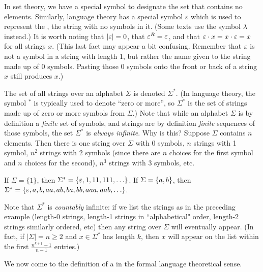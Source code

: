 \bigskip

In set theory, we have a special symbol to designate the set that 
contains no elements.  Similarly, language theory has a special 
symbol $\varepsilon$ which is used to represent the , the
string with no 
symbols in it.  (Some texts use the symbol $\lambda$ instead.)
It is worth noting that $|\varepsilon| = 0$, that $\varepsilon^R = \varepsilon$,
and that $\varepsilon \cdot x = x \cdot \varepsilon = x$ for all strings $x$.
(This last fact may appear a bit confusing.  Remember that $\varepsilon$
is not a symbol in a string with length 1, but rather the name given
to the string made up of 0 symbols.  Pasting those 0 symbols onto the
front or back of a string $x$ still produces $x$.) 

\bigskip

The set of all strings over an alphabet $\Sigma$ is denoted $\Sigma^*$.
(In language theory, the symbol $^*$ is typically used to denote ``zero
or more'', so $\Sigma^*$ is the set of strings made up of zero or 
more symbols from $\Sigma$.)  Note that while an alphabet 
$\Sigma$ is by 
definition a \emph{finite} set of symbols, and strings are by
definition \emph{finite} sequences of those symbols, the set $\Sigma^*$
is \emph{always infinite}.  Why is this?  Suppose $\Sigma$ contains $n$
elements.  Then there is one string over $\Sigma$ with 0 symbols,
$n$ strings with 1 symbol, $n^2$ strings with 2 symbols (since there
are $n$ choices for the first symbol and $n$ choices for the second),
$n^3$ strings with 3 symbols, etc.

\smallskip

\begin{example} If $\Sigma = \{1\}$, then $\Sigma^* = \{\varepsilon,
1, 11, 111, \ldots\}$.  If $\Sigma = \mbox{$\{a,b\}$}$, then $\Sigma^* = \{
\varepsilon, a, b, aa, ab, ba, bb, aaa, aab, \ldots\}$.
\end{example}

\smallskip

Note that $\Sigma^*$ is \emph{countably} infinite: if we list the strings as in
the preceding example (length-0 strings, length-1 strings in ``alphabetical"
order, length-2 strings similarly ordered, etc) then any string over $\Sigma$
will eventually appear.  (In fact, if $|\Sigma| = n \geq 2$ and $x \in \Sigma^*$ has
length $k$, then $x$ will appear on the list within the first $\frac{n^{k+1} -
1}{n-1}$ entries.)

\bigskip

We now come to the definition of a  in the formal language
theoretical sense.



